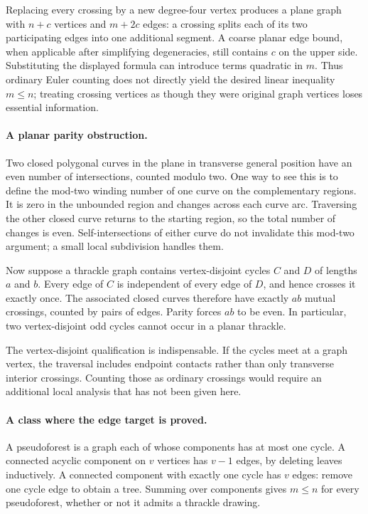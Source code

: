\documentclass[11pt,a4paper]{article}
\begin{document}
Replacing every crossing by a new degree-four vertex produces a plane graph with $n+c$ vertices and $m+2c$ edges: a crossing splits each of its two participating edges into one additional segment. A coarse planar edge bound, when applicable after simplifying degeneracies, still contains $c$ on the upper side. Substituting the displayed formula can introduce terms quadratic in $m$. Thus ordinary Euler counting does not directly yield the desired linear inequality $m\le n$; treating crossing vertices as though they were original graph vertices loses essential information.

\paragraph{A planar parity obstruction.}
Two closed polygonal curves in the plane in transverse general position have an even number of intersections, counted modulo two. One way to see this is to define the mod-two winding number of one curve on the complementary regions. It is zero in the unbounded region and changes across each curve arc. Traversing the other closed curve returns to the starting region, so the total number of changes is even. Self-intersections of either curve do not invalidate this mod-two argument; a small local subdivision handles them.

Now suppose a thrackle graph contains vertex-disjoint cycles $C$ and $D$ of lengths $a$ and $b$. Every edge of $C$ is independent of every edge of $D$, and hence crosses it exactly once. The associated closed curves therefore have exactly $ab$ mutual crossings, counted by pairs of edges. Parity forces $ab$ to be even. In particular, two vertex-disjoint odd cycles cannot occur in a planar thrackle.

The vertex-disjoint qualification is indispensable. If the cycles meet at a graph vertex, the traversal includes endpoint contacts rather than only transverse interior crossings. Counting those as ordinary crossings would require an additional local analysis that has not been given here.

\paragraph{A class where the edge target is proved.}
A pseudoforest is a graph each of whose components has at most one cycle. A connected acyclic component on $v$ vertices has $v-1$ edges, by deleting leaves inductively. A connected component with exactly one cycle has $v$ edges: remove one cycle edge to obtain a tree. Summing over components gives $m\le n$ for every pseudoforest, whether or not it admits a thrackle drawing.
\end{document}
